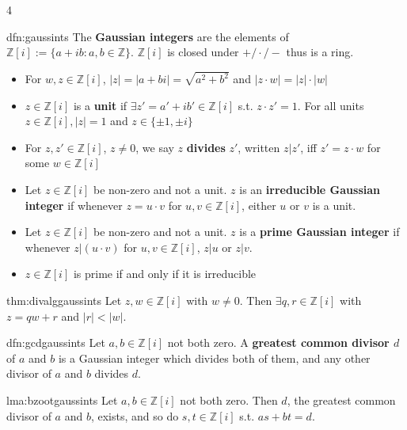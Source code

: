 \documentclass[landscape, 8pt]{extarticle}
\begin{document}
\begin{multicols*}{4}
		
		\begin{mdfn}{dfn:gaussints}{ }
			The \textbf{Gaussian integers} are the elements of $\mathbb{Z}[i] := \{a + ib : a, b\in \mathbb{Z}\}$. $\mathbb{Z}[i]$ is closed under $+/\cdot/-$ thus is a ring.
			\begin{itemize}
				\item For $w, z\in \mathbb{Z}[i]$, $\left|z\right| = \left|a + bi\right| = \sqrt{a^2 + b^2}$ and $\left|z \cdot w\right| = \left|z\right| \cdot \left|w\right|$
				\item $z\in \mathbb{Z}[i]$ is a \textbf{unit} if $\exists z' = a' + ib'\in \mathbb{Z}[i]$ s.t. $z \cdot  z' = 1$. For all units $z\in \mathbb{Z}[i], \left|z\right| = 1$ and $z\in \{\pm 1, \pm i\}$
				\item For $z, z'\in \mathbb{Z}[i]$, $z \ne 0$, we say $z$ \textbf{divides} $z'$, written $z | z'$, iff $z' = z \cdot w$ for some $w\in \mathbb{Z}[i]$ 
				\item Let $z\in \mathbb{Z}[i]$ be non-zero and not a unit. $z$ is an \textbf{irreducible Gaussian integer} if whenever $z = u\cdot v$ for $u, v\in \mathbb{Z}[i]$, either $u$ or $v$ is a unit.
				\item Let $z\in \mathbb{Z}[i]$ be non-zero and not a unit. $z$ is a \textbf{prime Gaussian integer} if whenever $z|(u \cdot v)$ for $u, v\in \mathbb{Z}[i]$, $z|u$ or $z|v$.
				\item $z\in \mathbb{Z}[i]$ is prime if and only if it is irreducible
			\end{itemize}
			
		\end{mdfn}
		
		
		\begin{thm}{thm:divalggaussints}{ }
			Let $z, w\in \mathbb{Z}[i]$ with $w \ne 0$. Then $\exists q, r\in \mathbb{Z}[i]$ with $z = qw +r$ and $\left|r\right| < \left|w\right|$.
			
		\end{thm}
		
		
		\begin{dfn}{dfn:gcdgaussints}{ }
			Let $a, b\in \mathbb{Z}[i]$ not both zero. A \textbf{greatest common divisor $d$} of $a$ and $b$ is a Gaussian integer which divides both of them, and any other divisor of $a$ and $b$ divides $d$.
			
		\end{dfn}
		
		
		\begin{lma}{lma:bzootgaussints}{ }
			Let $a, b\in \mathbb{Z}[i]$ not both zero. Then $d$, the greatest common divisor of $a$ and $b$, exists, and so do $s, t\in \mathbb{Z}[i]$ s.t. $as + bt = d$.
			

\end{lma}
\end{multicols*}
\end{document}
